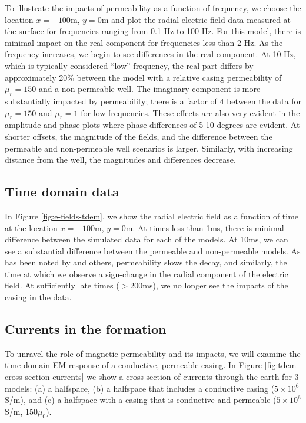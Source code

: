 To illustrate the impacts of permeability as a function of frequency, we choose the location $x=-100$m, $y=0$m and plot the radial electric field data measured at the surface for frequencies ranging from 0.1 Hz to 100 Hz. For this model, there is minimal impact on the real component for frequencies less than 2 Hz. As the frequency increases, we begin to see differences in the real component. At 10 Hz, which is typically considered ``low'' frequency, the real part differs by approximately 20\% between the model with a relative casing permeability of $\mu_r=150$ and a non-permeable well. The imaginary component is more substantially impacted by permeability; there is a factor of 4 between the data for $\mu_r=150$ and $\mu_r=1$ for low frequencies. These effects are also very evident in the amplitude and phase plots where phase differences of 5-10 degrees are evident. At shorter offsets, the magnitude of the fields, and the difference between the permeable and non-permeable well scenarios is larger. Similarly, with increasing distance from the well, the magnitudes and differences decrease.




\subsection{Time domain data}

In Figure \ref{fig:e-fields-tdem}, we show the radial electric field as a function of time at the location $x=-100$m, $y=0$m.  At times less than 1ms, there is minimal difference between the simulated data for each of the models. At 10ms, we can see a substantial difference between the permeable and non-permeable models. As has been noted by \citep{Pavlov2001} and others, permeability slows the decay, and similarly, the time at which we observe a sign-change in the radial component of the electric field. At sufficiently late times ($>$200ms), we no longer see the impacts of the casing in the data.




\subsection{Currents in the formation}

To unravel the role of magnetic permeability and its impacts, we will examine the time-domain EM response of a conductive, permeable casing. In Figure \ref{fig:tdem-cross-section-currents} we show a cross-section of currents through the earth for 3 models: (a) a halfspace, (b) a halfspace that includes a conductive casing ($5\times10^6$ S/m), and (c) a halfspace with a casing that is conductive and permeable ($5\times10^6$ S/m, $150\mu_0$).

